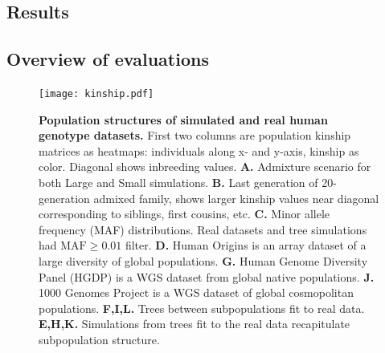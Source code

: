 \documentclass[11pt]{article}
\begin{document}
\begin{linenumbers}
\section{Results}

\subsection{Overview of evaluations}

\begin{figure}[hp]
  \centering
  \texttt{[image: kinship.pdf]}
  \caption{
    {\bf Population structures of simulated and real human genotype datasets.}
    First two columns are population kinship matrices as heatmaps: individuals along x- and y-axis, kinship as color.
    Diagonal shows inbreeding values.
    \textbf{A.}
    Admixture scenario for both Large and Small simulations.
    \textbf{B.}
    Last generation of 20-generation admixed family, shows larger kinship values near diagonal corresponding to siblings, first cousins, etc.
    \textbf{C.}
    Minor allele frequency (MAF) distributions.
    Real datasets and tree simulations had $\text{MAF} \ge 0.01$ filter.
    \textbf{D.}
    Human Origins is an array dataset of a large diversity of global populations.
    \textbf{G.}
    Human Genome Diversity Panel (HGDP) is a WGS dataset from global native populations.
    \textbf{J.}
    1000 Genomes Project is a WGS dataset of global cosmopolitan populations.
    \textbf{F,I,L.}
    Trees between subpopulations fit to real data.
    \textbf{E,H,K.}
    Simulations from trees fit to the real data recapitulate subpopulation structure.
  }
  \label{fig:kinship}
\end{figure}


\end{linenumbers}
\end{document}
